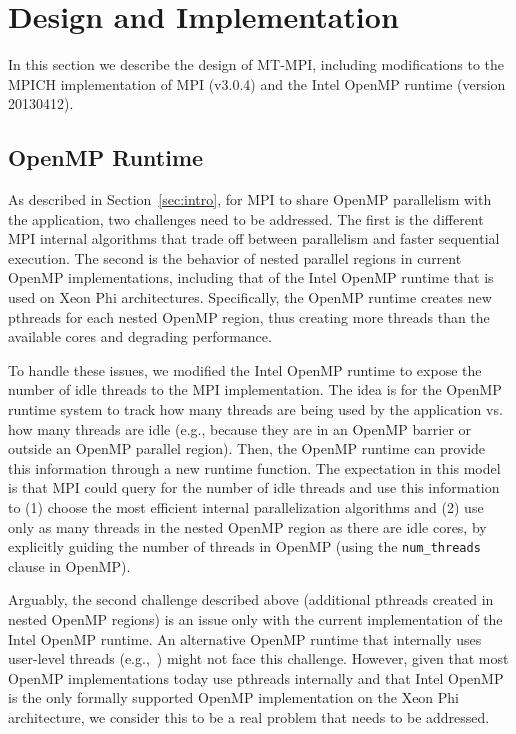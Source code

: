 \vspace{-2.0ex}
\section{Design and Implementation}\label{sec:des_and_impl}

In this section we describe the design of MT-MPI, including
modifications to the MPICH implementation of MPI (v3.0.4) and the
Intel OpenMP runtime (version 20130412).


\subsection{OpenMP Runtime}\label{sec:des-openmp}

As described in Section~\ref{sec:intro}, for MPI to share OpenMP
parallelism with the application, two challenges need to be addressed.
The first is the different MPI internal algorithms that trade off
between parallelism and faster sequential execution.  The second is
the behavior of nested parallel regions in current OpenMP
implementations, including that of the Intel OpenMP runtime that is
used on Xeon Phi architectures.  Specifically, the OpenMP runtime
creates new pthreads for each nested OpenMP region, thus creating more
threads than the available cores and degrading performance.

To handle these issues, we modified the Intel OpenMP runtime to expose
the number of idle threads to the MPI implementation.  The idea is for
the OpenMP runtime system to track how many threads are being used by
the application vs. how many threads are idle (e.g., because they are
in an OpenMP barrier or outside an OpenMP parallel region).  Then, the
OpenMP runtime can provide this information through a new runtime
function.  The expectation in this model is that MPI could query for
the number of idle threads and use this information to (1) choose the
most efficient internal parallelization algorithms and (2) use only as
many threads in the nested OpenMP region as there are idle cores, by
explicitly guiding the number of threads in OpenMP (using the
\texttt{num\_threads} clause in OpenMP).

Arguably, the second challenge described above (additional pthreads
created in nested OpenMP regions) is an issue only with the current
implementation of the Intel OpenMP runtime.  An alternative OpenMP
runtime that internally uses user-level threads
(e.g.,~\cite{olivier12:openmp_qthreads}) might not face this
challenge.  However, given that most OpenMP implementations today use
pthreads internally and that Intel OpenMP is the only formally
supported OpenMP implementation on the Xeon Phi architecture, we
consider this to be a real problem that needs to be addressed.


